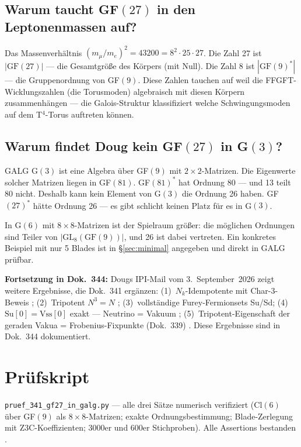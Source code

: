 \subsection*{Warum taucht GF$(27)$ in den Leptonenmassen auf?}

Das Massenverhältnis $(m_\mu/m_e)^2 = 43200 = 8^2 \cdot 25 \cdot 27$.
Die Zahl 27 ist $|\text{GF}(27)|$ --- die Gesamtgröße des Körpers (mit Null).
Die Zahl 8 ist $|\text{GF}(9)^*|$ --- die Gruppenordnung von GF$(9)$.
Diese Zahlen tauchen auf weil die FFGFT-Wicklungszahlen (die Torusmoden)
algebraisch mit diesen Körpern zusammenhängen --- die Galois-Struktur
klassifiziert welche Schwingungsmoden auf dem T$^4$-Torus auftreten können.

\subsection*{Warum findet Doug kein GF$(27)$ in G$(3)$?}

GALG G$(3)$ ist eine Algebra über GF$(9)$ mit $2\times2$-Matrizen.
Die Eigenwerte solcher Matrizen liegen in GF$(81)$.
GF$(81)^*$ hat Ordnung 80 --- und 13 teilt 80 nicht.
Deshalb kann kein Element von G$(3)$ die Ordnung 26 haben.
GF$(27)^*$ hätte Ordnung 26 --- es gibt schlicht keinen Platz für es in G$(3)$.

In G$(6)$ mit $8\times8$-Matrizen ist der Spielraum größer:
die möglichen Ordnungen sind Teiler von $|\text{GL}_8(\text{GF}(9))|$,
und 26 ist dabei vertreten.
Ein konkretes Beispiel mit nur 5 Blades ist in §\ref{sec:minimal} angegeben
und direkt in GALG prüfbar.


\textbf{Fortsetzung in Dok.~344:} Dougs IPI-Mail vom 3.~September~2026 zeigt
weitere Ergebnisse, die Dok.~341 erg\"anzen: (1)~$N_k$-Idempotente mit Char-3-Beweis
\BM; (2)~Tripotent $N^3=N$ \BM; (3)~vollst\"andige Furey-Fermionsets Su/Sd;
(4)~$\mathrm{Su}[0] = \mathrm{Vss}[0]$ exakt --- Neutrino = Vakuum \BM;
(5)~Tripotent-Eigenschaft der geraden Vakua = Frobenius-Fixpunkte (Dok.~339) \BM.
Diese Ergebnisse sind in Dok.~344 dokumentiert.

\section*{Prüfskript}

\texttt{pruef\_341\_gf27\_in\_galg.py} --- alle drei Sätze numerisch verifiziert
(Cl$(6)$ über GF$(9)$ als $8\times8$-Matrizen; exakte Ordnungsbestimmung;
Blade-Zerlegung mit Z3C-Koeffizienten; 3000er und 600er Stichproben).
Alle Assertions bestanden \BM.


